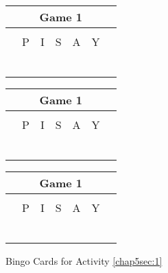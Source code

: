 \begin{figure}[!h]
\centering
\caption{Bingo Cards for Activity \eqref{chap5sec:1}}
\begin{tabular}{|c|c|c|c|c|c|c|}
\hline
\multicolumn{7}{|c|}{Game 1}\\
\hline
\multicolumn{7}{|c|}{}\\
\cline{2-6}
\hphantom{.} & P & I & S & A & Y & \hphantom{.}\\
\cline{2-6}
 & & &\cellcolor{green!50!yellow} & & & \\ \cline{2-6}
 & & &\cellcolor{green!50!yellow} & & & \\ \cline{2-6}
 & & &\cellcolor{green!50!yellow} & & & \\ \cline{2-6}
 & & &\cellcolor{green!50!yellow} & & & \\ \cline{2-6}
 & & &\cellcolor{green!50!yellow} & & & \\ \cline{2-6}
\multicolumn{7}{|c|}{}\\
\hline
\end{tabular}
\hfil 
\begin{tabular}{|c|c|c|c|c|c|c|}
\hline
\multicolumn{7}{|c|}{Game 1}\\
\hline
\multicolumn{7}{|c|}{}\\
\cline{2-6}
\hphantom{.} & P & I & S & A & Y & \hphantom{.}\\
\cline{2-6}
 &\cellcolor{green!50!yellow} & & & & \cellcolor{green!50!yellow} & \\ \cline{2-6}
 & & & & & & \\ \cline{2-6}
 & & &\cellcolor{green!50!yellow} & & & \\ \cline{2-6}
 & & & & & & \\ \cline{2-6}
 & \cellcolor{green!50!yellow} & & & & \cellcolor{green!50!yellow} & \\ \cline{2-6}
\multicolumn{7}{|c|}{}\\
\hline
\end{tabular}
\hfil 
\begin{tabular}{|c|c|c|c|c|c|c|}
\hline
\multicolumn{7}{|c|}{Game 1}\\
\hline
\multicolumn{7}{|c|}{}\\
\cline{2-6}
\hphantom{.} & P & I & S & A & Y & \hphantom{.}\\
\cline{2-6}
 &\cellcolor{green!50!yellow} & & & & \cellcolor{green!50!yellow} & \\ \cline{2-6}
 & & \cellcolor{green!50!yellow} & & \cellcolor{green!50!yellow} & & \\ \cline{2-6}
 & & &\cellcolor{green!50!yellow} & & & \\ \cline{2-6}
 & & \cellcolor{green!50!yellow} & & \cellcolor{green!50!yellow} & & \\ \cline{2-6}
 & \cellcolor{green!50!yellow} & & & & \cellcolor{green!50!yellow} & \\ \cline{2-6}
\multicolumn{7}{|c|}{}\\
\hline
\end{tabular}
\label{chap5fig:1}
\end{figure}

